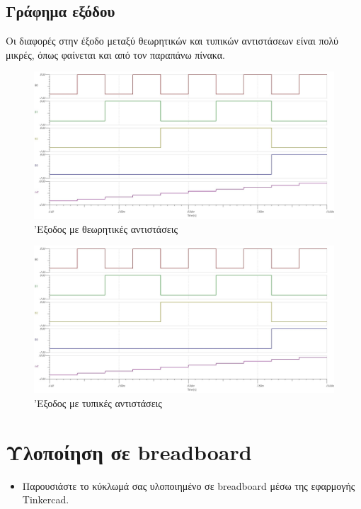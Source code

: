 \documentclass[12pt]{article}
\begin{document}
\subsection{Γράφημα εξόδου}

Οι διαφορές στην έξοδο μεταξύ θεωρητικών και τυπικών αντιστάσεων είναι πολύ
μικρές, όπως φαίνεται και από τον παραπάνω πίνακα.

\begin{figure}[H]
	\centering
	\includegraphics[width=\linewidth]{./res/theoretical.jpg}
	\caption{'Εξοδος με θεωρητικές αντιστάσεις}
\end{figure}

\begin{figure}[H]
	\centering
	\includegraphics[width=\linewidth]{./res/practical.jpg}
	\caption{'Εξοδος με τυπικές αντιστάσεις}
\end{figure}

\section{Υλοποίηση σε breadboard}

\begin{itemize}
	\item Παρουσιάστε το κύκλωμά σας υλοποιημένο σε breadboard μέσω
		της εφαρμογής Tinkercad.
\end{itemize}

\end{document}
